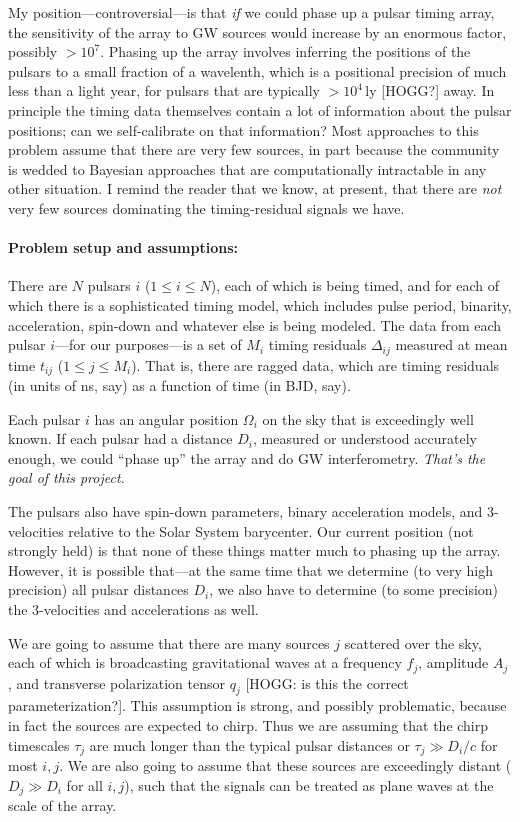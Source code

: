 \documentclass{article}
\begin{document}
My position---controversial---is that \emph{if} we could phase up a pulsar timing array, the sensitivity of the array to GW sources would increase by an enormous factor, possibly $>10^7$.
Phasing up the array involves inferring the positions of the pulsars to a small fraction of a wavelenth, which is a positional precision of much less than a light year, for pulsars that are typically $>10^4$\,ly [HOGG?] away.
In principle the timing data themselves contain a lot of information about the pulsar positions; can we self-calibrate on that information?
Most approaches to this problem assume that there are very few sources, in part because the community is wedded to Bayesian approaches that are computationally intractable in any other situation.
I remind the reader that we know, at present, that there are \emph{not} very few sources dominating the timing-residual signals we have.

\paragraph{Problem setup and assumptions:}
There are $N$ pulsars $i$ ($1\leq i\leq N$), each of which is being timed, and for each of which there is a sophisticated timing model, which includes pulse period, binarity, acceleration, spin-down and whatever else is being modeled.
The data from each pulsar $i$---for our purposes---is a set of $M_i$ timing residuals $\Delta_{ij}$ measured at mean time $t_{ij}$ ($1\leq j\leq M_i$).
That is, there are ragged data, which are timing residuals (in units of ns, say) as a function of time (in BJD, say).

Each pulsar $i$ has an angular position $\Omega_i$ on the sky that is exceedingly well known.
If each pulsar had a distance $D_i$, measured or understood accurately enough, we could ``phase up'' the array and do GW interferometry.
\emph{That's the goal of this project.}

The pulsars also have spin-down parameters, binary acceleration models, and 3-velocities relative to the Solar System barycenter.
Our current position (not strongly held) is that none of these things matter much to phasing up the array.
However, it is possible that---at the same time that we determine (to very high precision) all pulsar distances $D_i$, we also have to determine (to some precision) the 3-velocities and accelerations as well.

We are going to assume that there are many sources $j$ scattered over the sky, each of which is broadcasting gravitational waves at a frequency $f_j$, amplitude $A_j$, and transverse polarization tensor $q_j$ [HOGG: is this the correct parameterization?].
This assumption is strong, and possibly problematic, because in fact the sources are expected to chirp.
Thus we are assuming that the chirp timescales $\tau_j$ are much longer than the typical pulsar distances or $\tau_j\gg D_i/c$ for most $i,j$.
We are also going to assume that these sources are exceedingly distant ($D_j\gg D_i$ for all $i,j$), such that the signals can be treated as plane waves at the scale of the array.
\end{document}
